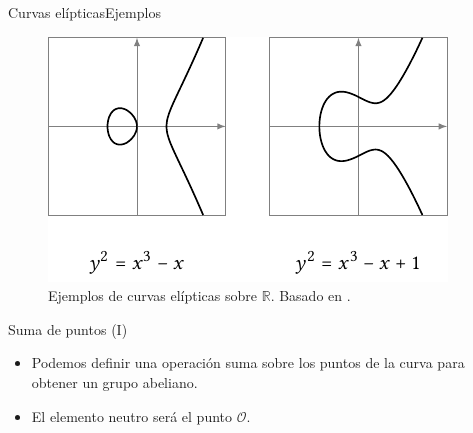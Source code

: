 \documentclass[spanish]{beamer}
\begin{document}
\begin{frame}[fragile]{Curvas elípticas}{Ejemplos}
  \begin{figure}[h]
    \centering
    \includegraphics[width=.75\textwidth]{img/ejemplos-curvas}
    \caption{Ejemplos de curvas elípticas sobre $\mathbb{R}$. Basado en \parencite{eichlseder_elliptic_2016}.}
    \label{fig:curva}
  \end{figure}
\end{frame}

\begin{frame}{Suma de puntos (I)}
  \begin{itemize}
    \item Podemos definir una operación suma sobre los puntos de la curva para obtener un grupo abeliano.
    \item El elemento neutro será el punto \(\mathcal{O}\).
  \end{itemize}
\end{frame}
\end{document}
